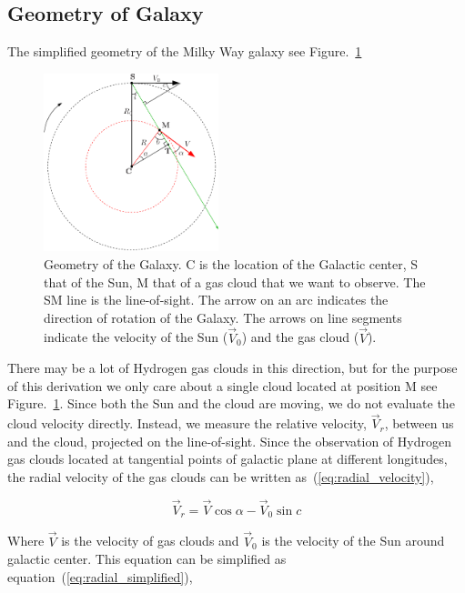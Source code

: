 \documentclass[conference]{IEEEtran}
\begin{document}
\subsection{Geometry of Galaxy}

The simplified geometry of the Milky Way galaxy\cite{CathyHorellou2015} see Figure.~\ref{fig:galgeo_figure}

\begin{figure}[htbp]
 \includegraphics[width=2.0in]{galgeom}
 \caption{Geometry of the Galaxy. C is the location of the Galactic center, S that of the Sun, M
that of a gas cloud that we want to observe. The SM line is the line-of-sight. The arrow
on an arc indicates the direction of rotation of the Galaxy. The arrows on line segments
indicate the velocity of the Sun ($\vec{V}_0$) and the gas cloud ($\vec{V}$)\cite{CathyHorellou2015}.}
 \label{fig:galgeo_figure}
\end{figure}

There may be a lot of Hydrogen gas clouds in this direction, but for the purpose of this derivation we only care about a single cloud located at position M see Figure.~\ref{fig:galgeo_figure}. Since both the Sun and the cloud are moving, we do not evaluate the cloud velocity directly. Instead, we measure the relative velocity, $\vec{V}_{r}$, between us and the cloud, projected on the line-of-sight\cite{CathyHorellou2015}. Since the observation of Hydrogen gas clouds located at tangential points of galactic plane at different longitudes, the radial velocity of the gas clouds can be written as~(\ref{eq:radial_velocity}),

\begin{equation}
  \vec{V}_{r}=\vec{V}\cos\alpha-\vec{V}_{0}\sin c
  \label{eq:radial_velocity}
\end{equation}

Where $\vec{V}$ is the velocity of gas clouds and $\vec{V}_{0}$ is the velocity of the Sun around galactic center. This equation can be simplified as equation~(\ref{eq:radial_simplified}),
\end{document}
